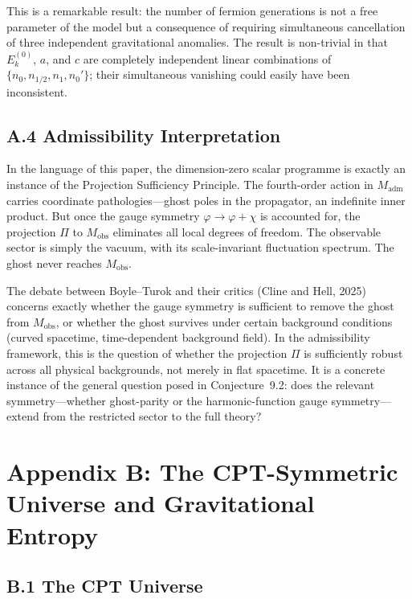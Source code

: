 \documentclass[12pt,a4paper]{article}
\theoremstyle{remark}
\begin{document}
This is a remarkable result: the number of fermion generations is not a free parameter of the
model but a consequence of requiring simultaneous cancellation of three independent gravitational
anomalies. The result is non-trivial in that $E_k^{(0)}$, $a$, and $c$ are completely independent
linear combinations of $\{n_0, n_{1/2}, n_1, n_0'\}$; their simultaneous vanishing could
easily have been inconsistent.

\subsection*{A.4 Admissibility Interpretation}

In the language of this paper, the dimension-zero scalar programme is exactly an instance of
the Projection Sufficiency Principle. The fourth-order action in $M_{\mathrm{adm}}$ carries
coordinate pathologies---ghost poles in the propagator, an indefinite inner product. But once
the gauge symmetry $\varphi \to \varphi + \chi$ is accounted for, the projection $\Pi$ to
$M_{\mathrm{obs}}$ eliminates all local degrees of freedom. The observable sector is simply the
vacuum, with its scale-invariant fluctuation spectrum. The ghost never reaches $M_{\mathrm{obs}}$.

The debate between Boyle--Turok and their critics (Cline and Hell, 2025) concerns exactly
whether the gauge symmetry is sufficient to remove the ghost from $M_{\mathrm{obs}}$, or whether
the ghost survives under certain background conditions (curved spacetime, time-dependent background
field). In the admissibility framework, this is the question of whether the projection $\Pi$ is
sufficiently robust across all physical backgrounds, not merely in flat spacetime. It is a concrete
instance of the general question posed in Conjecture~9.2: does the relevant symmetry---whether
ghost-parity or the harmonic-function gauge symmetry---extend from the restricted sector to the
full theory?


\section*{Appendix B: The CPT-Symmetric Universe and Gravitational Entropy}

\subsection*{B.1 The CPT Universe}
\end{document}
